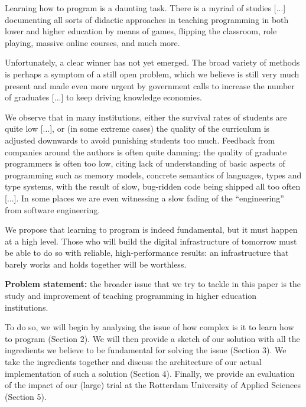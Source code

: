 Learning how to program is a daunting task. There is a myriad of studies [...] documenting all sorts of didactic approaches in teaching programming in both lower and higher education by means of games, flipping the classroom, role playing, massive online courses, and much more.

Unfortunately, a clear winner has not yet emerged. The broad variety of methods is perhaps a symptom of a still open problem, which we believe is still very much present and made even more urgent by government calls to increase the number of graduates [...] to keep driving knowledge economies. 

We observe that in many institutions, either the survival rates of students are quite low [...], or (in some extreme cases) the quality of the curriculum is adjusted downwards to avoid punishing students too much. Feedback from companies around the authors is often quite damning: the quality of graduate programmers is often too low, citing lack of understanding of basic aspects of programming such as memory models, concrete semantics of languages, types and type systems, with the result of slow, bug-ridden code being shipped all too often [...]. In some places we are even witnessing a slow fading of the “engineering” from software engineering. 

We propose that learning to program is indeed fundamental, but it must happen at a high level. Those who will build the digital infrastructure of tomorrow must be able to do so with reliable, high-performance results: an infrastructure that barely works and holds together will be worthless.

\textbf{Problem statement:} the broader issue that we try to tackle in this paper is the study and improvement of teaching programming in higher education institutions. 

To do so, we will begin by analysing the issue of how complex is it to learn how to program (Section 2). We will then provide a sketch of our solution with all the ingredients we believe to be fundamental for solving the issue (Section 3). We take the ingredients together and discuss the architecture of our actual implementation of such a solution (Section 4). Finally, we provide an evaluation of the impact of our (large) trial at the Rotterdam University of Applied Sciences (Section 5).
